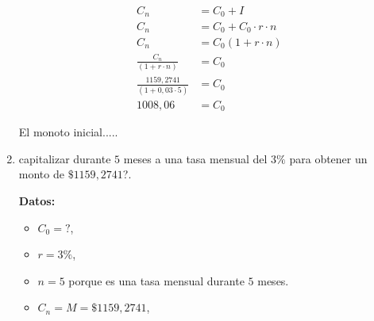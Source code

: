 \documentclass[12pt]{examdesign}
\theoremstyle{plain}
\theoremstyle{definition}
\theoremstyle{remark}
\begin{document}
\begin{shortanswer}[title={Leemos el material de consulta y realizamos las actividades propuestas.}, rearrange=no]
\begin{question}
\begin{answer}
\begin{enumerate}
        		         \begin{align*}
        		            C_n                               &= C_0+I                         \\
        		            C_n                               &= C_0+C_0\cdot r\cdot n         \\
        		            C_n                               &= C_0\left( 1+ r\cdot n\right)  \\
        		         	\frac{C_n}{(1+r\cdot n)}          &= C_0                           \\
        		            \frac{1159,2741}{(1+0,03\cdot 5)} &= C_0                           \\
        		            1008,06                           &= C_0
        		         \end{align*}
        		    
        		    El monoto inicial.....
        		    
        			\item capitalizar durante $5$ meses a una tasa mensual del $3\%$ para obtener un monto de $\$1159,2741$?.
        			
        			    \textbf{Datos:}
        			    
        			    \begin{itemize}
        			    	\item $C_{0}=?$,
        			    	\item $r=3\%$,
        			    	\item $n=5$ porque es una tasa mensual durante $5$ meses.
        			    	\item $C_{n}=M=\$1159,2741$,
        			    \end{itemize}
        			    

\end{enumerate}
\end{answer}
\end{question}
\end{shortanswer}
\end{document}
